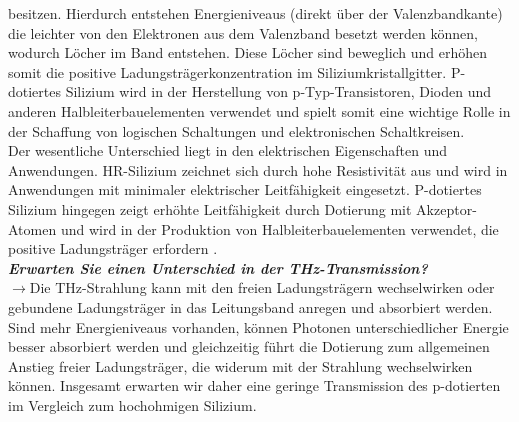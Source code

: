 besitzen. Hierdurch entstehen Energieniveaus (direkt über der Valenzbandkante) 
die leichter von den Elektronen aus dem Valenzband besetzt werden können, wodurch Löcher im 
Band entstehen. Diese Löcher sind beweglich und erhöhen somit die positive 
Ladungsträgerkonzentration im Siliziumkristallgitter. 
P-dotiertes Silizium wird in der Herstellung von p-Typ-Transistoren, 
Dioden und anderen Halbleiterbauelementen verwendet und spielt somit 
eine wichtige Rolle in der Schaffung von logischen Schaltungen 
und elektronischen Schaltkreisen. \\
Der wesentliche Unterschied liegt in den elektrischen Eigenschaften und Anwendungen. 
HR-Silizium zeichnet sich durch hohe Resistivität aus und wird in Anwendungen mit minimaler 
elektrischer Leitfähigkeit eingesetzt. 
P-dotiertes Silizium hingegen zeigt erhöhte Leitfähigkeit durch Dotierung 
mit Akzeptor-Atomen und wird in der Produktion von Halbleiterbauelementen verwendet, 
die positive Ladungsträger erfordern \cite{Demtroder, EPC}. \\ 

\textbf{\textit{Erwarten Sie einen Unterschied in der THz-Transmission?}}\\
$\rightarrow$Die THz-Strahlung kann mit den freien Ladungsträgern wechselwirken oder
gebundene Ladungsträger in das Leitungsband anregen und absorbiert werden. 
Sind mehr Energieniveaus vorhanden, können Photonen unterschiedlicher Energie besser
absorbiert werden und gleichzeitig führt die Dotierung zum allgemeinen 
Anstieg freier Ladungsträger, die widerum mit der Strahlung wechselwirken können.
Insgesamt erwarten wir daher eine geringe Transmission des p-dotierten im
Vergleich zum hochohmigen Silizium. 